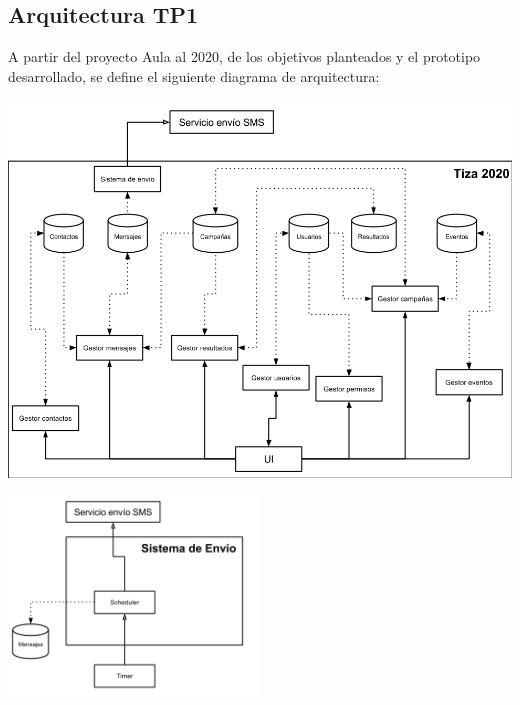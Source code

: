 \documentclass[a4paper, 11pt]{article}
\begin{document}
\subsection{Arquitectura TP1}
A partir del proyecto Aula al 2020, de los objetivos planteados y el prototipo desarrollado, se define el siguiente diagrama de arquitectura:

\centerline{\includegraphics[width=1.2\textwidth]{./diagramas/ArquitecturaTP1.png}}
\centerline{\includegraphics[width=0.5\textwidth]{./diagramas/ArqTP1SistEnvio.png}}
\end{document}
